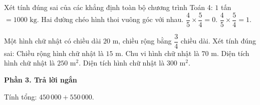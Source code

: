 \begin{ex} %
Xét tính đúng sai của các khẳng định toàn bộ chương trình Toán 4:
\choiceTF
{\True $1$ tấn $= 1000\text{ kg}$.}
{\True Hai đường chéo hình thoi vuông góc với nhau.}
{$\dfrac{4}{5} \times \dfrac{5}{4} = 0$.}
{\True $\dfrac{4}{5} \times \dfrac{5}{4} = 1$.}
\end{ex}

\begin{ex} %
Một hình chữ nhật có chiều dài $20\text{ m}$, chiều rộng bằng $\dfrac{3}{4}$ chiều dài. Xét tính đúng sai:
\choiceTF
{\True Chiều rộng hình chữ nhật là $15\text{ m}$.}
{\True Chu vi hình chữ nhật là $70\text{ m}$.}
{Diện tích hình chữ nhật là $250\text{ m}^2$.}
{\True Diện tích hình chữ nhật là $300\text{ m}^2$.}
\end{ex}

\textbf{Phần 3. Trả lời ngắn}

\begin{ex} %
Tính tổng: $450\,000 + 550\,000$.
\end{ex}

